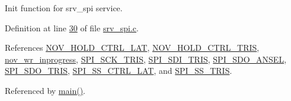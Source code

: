 Init function for srv\+\_\+spi service. 



Definition at line \hyperlink{a00030_source_l00030}{30} of file \hyperlink{a00030_source}{srv\+\_\+spi.\+c}.



References \hyperlink{a00011_source_l00122}{N\+O\+V\+\_\+\+H\+O\+L\+D\+\_\+\+C\+T\+R\+L\+\_\+\+L\+A\+T}, \hyperlink{a00011_source_l00121}{N\+O\+V\+\_\+\+H\+O\+L\+D\+\_\+\+C\+T\+R\+L\+\_\+\+T\+R\+I\+S}, \hyperlink{a00058_source_l00019}{nov\+\_\+wr\+\_\+inprogress}, \hyperlink{a00011_source_l00113}{S\+P\+I\+\_\+\+S\+C\+K\+\_\+\+T\+R\+I\+S}, \hyperlink{a00011_source_l00118}{S\+P\+I\+\_\+\+S\+D\+I\+\_\+\+T\+R\+I\+S}, \hyperlink{a00011_source_l00116}{S\+P\+I\+\_\+\+S\+D\+O\+\_\+\+A\+N\+S\+E\+L}, \hyperlink{a00011_source_l00115}{S\+P\+I\+\_\+\+S\+D\+O\+\_\+\+T\+R\+I\+S}, \hyperlink{a00011_source_l00110}{S\+P\+I\+\_\+\+S\+S\+\_\+\+C\+T\+R\+L\+\_\+\+L\+A\+T}, and \hyperlink{a00011_source_l00111}{S\+P\+I\+\_\+\+S\+S\+\_\+\+T\+R\+I\+S}.



Referenced by \hyperlink{a00046_source_l00080}{main()}.


